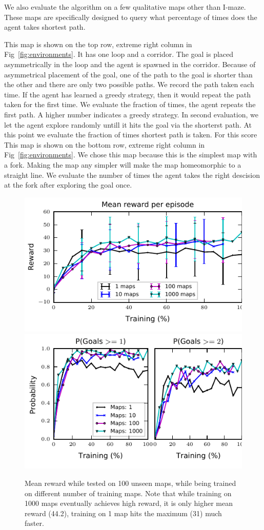 We also evaluate the algorithm on a few qualitative maps other than I-maze. These maps are specifically designed to query what percentage of times does the agent takes shortest path.

\setcounter{Benchmark}{0}
\begin{description}
    This map is shown on the top row, extreme right column in Fig~\ref{fig:environments}. It has one loop and a corridor.
    The goal is placed asymmetrically in the loop and the agent is spawned in the corridor.
    Because of asymmetrical placement of the goal, one of the path to the goal is shorter than the other and there are only two possible paths.
    We record the path taken each time. If the agent has learned a greedy strategy, then it would repeat the path taken for the first time.
    We evaluate the fraction of times, the agent repeats the first path. A higher number indicates a greedy strategy.
    In second evaluation, we let the agent explore randomly untill it hits the goal via the shorterst path.
    At this point we evaluate the  fraction of times shortest path is taken. For this score 
    This map is shown on the bottom row, extreme right column in Fig~\ref{fig:environments}.
    We chose this map because this is the simplest map with a fork. Making the map any simpler will make the map homeomorphic to a straight line. 
    We evaluate the number of times the agent takes the right descision at the fork after exploring the goal once.
\end{description}

\begin{figure}%
 \vspace{-3em}%
\includegraphics[width=0.5\columnwidth]{images/plot_reward_3D-1000.pdf}%
\includegraphics[width=0.5\columnwidth]{images/plot_probability_3D-1000.pdf}%
\vspace{-1em}%
\caption{Mean reward while tested on 100 unseen maps, while being trained on different number of training maps. Note that while training on 1000 maps eventually achieves high reward, it is only higher mean reward (44.2), training on 1 map hits the maximum (31) much faster.}%
\label{fig:plot_reward_on_testing}%
\end{figure}

